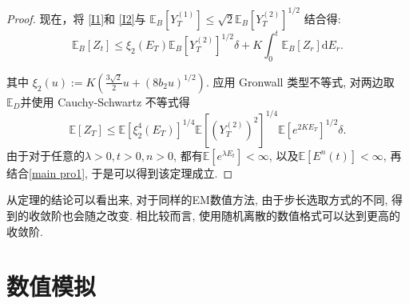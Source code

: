 \begin{proof}
	现在，将 \cref{I1}和 \cref{I2}与  $\mathbb{E}_B[Y_T^{(1)}]\leq\sqrt{2}\mathbb{E}_B[Y_T^{(2)}]^{1/2}$ 结合得:
	\begin{equation*}
			\mathbb{E}_B[Z_t] 
		\leq \xi_2(E_T)\mathbb{E}_B[Y_T^{(2)}]^{1/2}\delta + K\int_0^t\mathbb{E}_B[Z_r] \mathrm{d}E_r.
	\end{equation*}

	其中 $\xi_2(u) := K(\frac{3\sqrt{2}}{2}u + (8b_2u)^{1/2}).$
	应用 Gronwall 类型不等式, 对两边取 $ \mathbb{E}_D $并使用 Cauchy-Schwartz 不等式得 
	\begin{equation*}
			\mathbb{E}[Z_T] \leq \mathbb{E}[\xi_2^4(E_T)]^{1/4}\mathbb{E}[(Y_T^{(2)})^2]^{1/4}\mathbb{E}[e^{2KE_T}]^{1/2}\delta.
	\end{equation*}
	由于对于任意的$\lambda>0, t>0,n>0$, 都有$\mathbb{E}[e^{\lambda E_t}] < \infty$, 以及$\mathbb{E}[E^n(t)] < \infty$, 再结合\cref{main pro1}, 于是可以得到该定理成立.
\end{proof}

	\begin{remark}
		从定理的结论可以看出来, 对于同样的EM数值方法, 由于步长选取方式的不同, 得到的收敛阶也会随之改变.  相比较而言, 使用随机离散的数值格式可以达到更高的收敛阶.
	\end{remark}

	\section{数值模拟}
	
	
